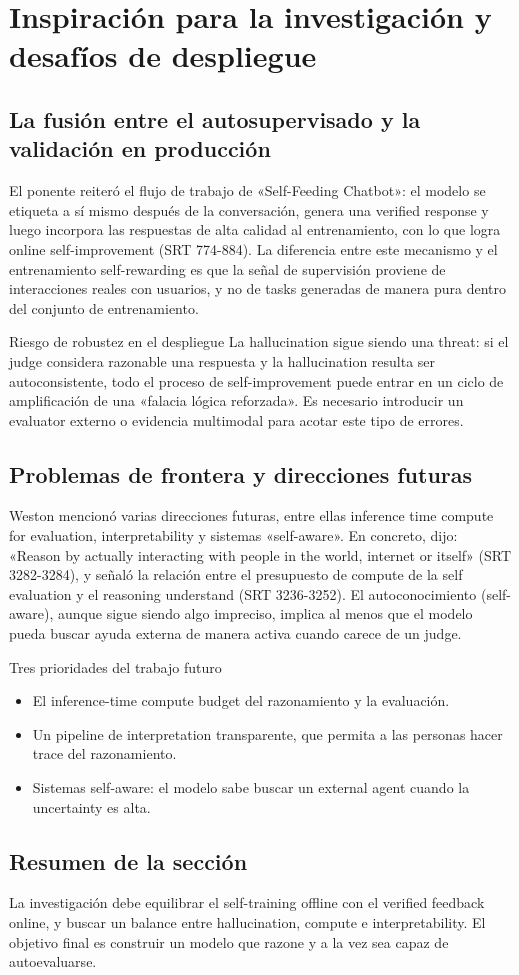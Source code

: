 \section{Inspiración para la investigación y desafíos de despliegue}
\subsection{La fusión entre el autosupervisado y la validación en producción}
El ponente reiteró el flujo de trabajo de «Self-Feeding Chatbot»: el modelo se etiqueta a sí mismo después de la conversación, genera una verified response y luego incorpora las respuestas de alta calidad al entrenamiento, con lo que logra online self-improvement (SRT 774-884). La diferencia entre este mecanismo y el entrenamiento self-rewarding es que la señal de supervisión proviene de interacciones reales con usuarios, y no de tasks generadas de manera pura dentro del conjunto de entrenamiento.

\begin{warningbox}{Riesgo de robustez en el despliegue}
La hallucination sigue siendo una threat: si el judge considera razonable una respuesta y la hallucination resulta ser autoconsistente, todo el proceso de self-improvement puede entrar en un ciclo de amplificación de una «falacia lógica reforzada». Es necesario introducir un evaluator externo o evidencia multimodal para acotar este tipo de errores.
\end{warningbox}

\subsection{Problemas de frontera y direcciones futuras}
Weston mencionó varias direcciones futuras, entre ellas inference time compute for evaluation, interpretability y sistemas «self-aware». En concreto, dijo: «Reason by actually interacting with people in the world, internet or itself» (SRT 3282-3284), y señaló la relación entre el presupuesto de compute de la self evaluation y el reasoning understand (SRT 3236-3252). El autoconocimiento (self-aware), aunque sigue siendo algo impreciso, implica al menos que el modelo pueda buscar ayuda externa de manera activa cuando carece de un judge.

\begin{importantbox}{Tres prioridades del trabajo futuro}
\begin{itemize}
    \item El inference-time compute budget del razonamiento y la evaluación.
    \item Un pipeline de interpretation transparente, que permita a las personas hacer trace del razonamiento.
    \item Sistemas self-aware: el modelo sabe buscar un external agent cuando la uncertainty es alta.
\end{itemize}
\end{importantbox}

\subsection{Resumen de la sección}
La investigación debe equilibrar el self-training offline con el verified feedback online, y buscar un balance entre hallucination, compute e interpretability. El objetivo final es construir un modelo que razone y a la vez sea capaz de autoevaluarse.

